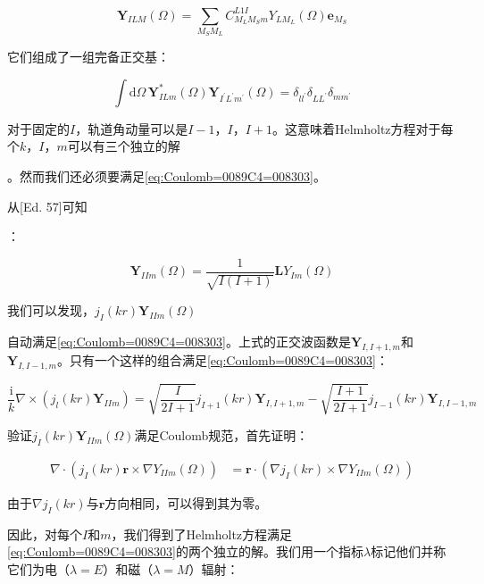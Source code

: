 \begin{equation}
\boldsymbol{Y}_{ILM}(\Omega)=\sum_{M_{S}M_{L}}C^{L1I}_{M_{L}M_{S}m}Y_{LM_{L}}(\Omega)\boldsymbol{e}_{M_{S}}
\end{equation}

它们组成了一组完备正交基：

\[
\int\mathrm{d}\Omega\,\boldsymbol{Y}^{*}_{ILm}(\Omega)\boldsymbol{Y}_{I^{\prime}L^{\prime}m^{\prime}}(\Omega)=\delta_{ll^{\prime}}\delta_{LL^{\prime}}\delta_{mm^{\prime}}
\]

对于固定的$I$，轨道角动量可以是$I-1$，$I$，$I+1$。这意味着Helmholtz方程对于每个$k$，$I$，$m$可以有三个独立的解

。然而我们还必须要满足\ref{eq:Coulomb=0089C4=008303}。

从{[}Ed. 57{]}可知

：

\begin{equation}
\boldsymbol{Y}_{IIm}(\Omega)=\frac{1}{\sqrt{I(I+1)}}\boldsymbol{L}Y_{Im}(\Omega)\label{eq:=0077E2=0091CF=007403=008C10=0051FD=006570=007B80=00660E=005199=006CD5}
\end{equation}

我们可以发现，$j_{I}(kr)\boldsymbol{Y}_{IIm}(\Omega)$

自动满足\ref{eq:Coulomb=0089C4=008303}。上式的正交波函数是$\boldsymbol{Y}_{I,I+1,m}$和$\boldsymbol{Y}_{I,I-1,m}$。只有一个这样的组合满足\ref{eq:Coulomb=0089C4=008303}：

\begin{equation}
\frac{\mathrm{i}}{k}\nabla\times(j_{l}(kr)\boldsymbol{Y}_{IIm})=\sqrt{\frac{I}{2I+1}}j_{I+1}(kr)\boldsymbol{Y}_{I,I+1,m}-\sqrt{\frac{I+1}{2I+1}}j_{I-1}(kr)\boldsymbol{Y}_{I,I-1,m}
\end{equation}

\begin{booknote*}
验证$j_{I}(kr)\boldsymbol{Y}_{IIm}(\Omega)$满足Coulomb规范，首先证明：

\begin{align*}
\nabla\cdot\left(j_{I}(kr)\boldsymbol{r}\times\nabla Y_{IIm}(\Omega)\right) & =\boldsymbol{r}\cdot\left(\nabla j_{I}(kr)\times\nabla Y_{IIm}(\Omega)\right)
\end{align*}

由于$\nabla j_{I}(kr)$与$\boldsymbol{r}$方向相同，可以得到其为零。
\end{booknote*}
因此，对每个$I$和$m$，我们得到了Helmholtz方程满足\ref{eq:Coulomb=0089C4=008303}的两个独立的解。我们用一个指标$\lambda$标记他们并称它们为电（$\lambda=E$）和磁（$\lambda=M$）辐射：

